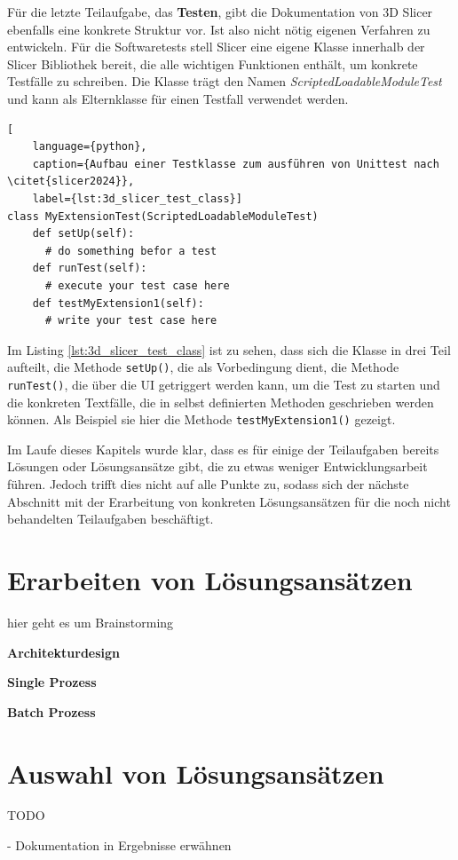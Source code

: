 Für die letzte Teilaufgabe, das \textbf{Testen}, gibt die Dokumentation von 3D Slicer
ebenfalls eine konkrete Struktur vor. Ist also nicht nötig eigenen Verfahren zu
entwickeln. Für die Softwaretests stell Slicer eine eigene Klasse innerhalb der Slicer
Bibliothek bereit, die alle wichtigen Funktionen enthält, um konkrete Testfälle zu
schreiben. Die Klasse trägt den Namen \textsl{ScriptedLoadableModuleTest} und kann
als Elternklasse für einen Testfall verwendet werden.

\begin{lstlisting}[
    language={python},
    caption={Aufbau einer Testklasse zum ausführen von Unittest nach \citet{slicer2024}},
    label={lst:3d_slicer_test_class}]
class MyExtensionTest(ScriptedLoadableModuleTest)
    def setUp(self):
      # do something befor a test
    def runTest(self):
      # execute your test case here
    def testMyExtension1(self):
      # write your test case here
\end{lstlisting}

Im Listing \ref{lst:3d_slicer_test_class} ist zu sehen, dass sich die Klasse in drei
Teil aufteilt, die Methode \texttt{setUp()}, die als Vorbedingung dient, die Methode
\texttt{runTest()}, die über die UI getriggert werden kann, um die Test zu
starten und die konkreten Textfälle, die in selbst definierten Methoden geschrieben
werden können. Als Beispiel sie hier die Methode \texttt{testMyExtension1()} gezeigt.

Im Laufe dieses Kapitels wurde klar, dass es für einige der Teilaufgaben bereits
Lösungen oder Lösungsansätze gibt, die zu etwas weniger Entwicklungsarbeit führen.
Jedoch trifft dies nicht auf alle Punkte zu, sodass sich der nächste Abschnitt mit
der Erarbeitung von konkreten Lösungsansätzen für die noch nicht behandelten Teilaufgaben
beschäftigt.

\section{Erarbeiten von Lösungsansätzen}
\label{sec:lösungsansätze} hier geht es um Brainstorming

\textbf{Architekturdesign}

\textbf{Single Prozess}

\textbf{Batch Prozess}


\section{Auswahl von Lösungsansätzen}

TODO

- Dokumentation in Ergebnisse erwähnen